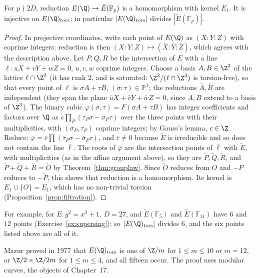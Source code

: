 \begin{proposition}\label{prop:reduction}
For $p\nmid2D$, reduction $E(\Q)\to\tilde E(\mathbb F_p)$ is a homomorphism with kernel $E_1$. It is injective on $E(\Q)_{\mathrm{tors}}$; in particular
$|E(\Q)_{\mathrm{tors}}|$ divides $|\tilde E(\mathbb F_p)|$.
\end{proposition}
\begin{proof}
In projective coordinates, write each point of $E(\Q)$ as $(X:Y:Z)$ with coprime integers; reduction is then $(X:Y:Z)\mapsto(\bar X:\bar Y:\bar Z)$, which
agrees with the description above. Let $P,Q,R$ be the intersection of $E$ with a line $\ell:uX+vY+wZ=0$, $u,v,w$ coprime integers. Choose a basis
$A,B\in\Z^3$ of the lattice $\ell\cap\Z^3$ (it has rank $2$, and is saturated: $\Z^3/(\ell\cap\Z^3)$ is torsion-free), so that every point of $\ell$ is
$\sigma A+\tau B$, $(\sigma:\tau)\in\mathbb P^1$; the reductions $\bar A,\bar B$ are independent (they span the plane $\bar u X+\bar vY+\bar wZ=0$, since $A,B$
extend to a basis of $\Z^3$). The binary cubic $\varphi(\sigma,\tau)=F(\sigma A+\tau B)$ has integer coefficients and factors over $\Q$ as
$c\prod_{P}(\tau_P\sigma-\sigma_P\tau)$ over the three points with their multiplicities, with $(\sigma_P,\tau_P)$ coprime integers; by Gauss's lemma, $c\in\Z$.
Reduce: $\bar\varphi=\bar c\prod(\bar\tau_P\sigma-\bar\sigma_P\tau)$, and $\bar c\ne0$ because $\tilde E$ is irreducible and so does not contain the line
$\bar\ell$. The roots of $\bar\varphi$ are the intersection points of $\bar\ell$ with $\tilde E$, with multiplicities (as in the affine argument above), so they are
$\tilde P,\tilde Q,\tilde R$, and $\tilde P+\tilde Q+\tilde R=\tilde O$ by Theorem~\ref{thm:grouplaw}. Since $\tilde O$ reduces from $O$ and $-P$ reduces
to $-\tilde P$, this shows that reduction is a homomorphism. Its kernel is $E_1\cup\{O\}=E_1$, which has no non-trivial torsion
(Proposition~\ref{prop:filtration}).
\end{proof}

For example, for $E:y^2=x^3+1$, $D=27$, and $\tilde E(\mathbb F_5)$ and $\tilde E(\mathbb F_{11})$ have $6$ and $12$ points (Exercise~\ref{ex:supersing}); so
$|E(\Q)_{\mathrm{tors}}|$ divides $6$, and the six points listed above are all of it.

\begin{remark}
Mazur proved in 1977 that $E(\Q)_{\mathrm{tors}}$ is one of $\Z/m$ for $1\le m\le10$ or $m=12$, or $\Z/2\times\Z/2m$ for $1\le m\le4$, and all fifteen occur.
The proof uses modular curves, the objects of Chapter~17.
\end{remark}

